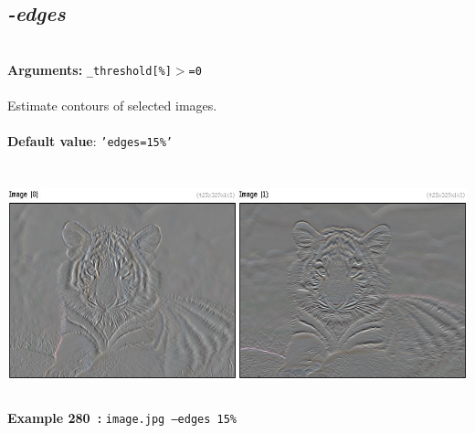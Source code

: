 \documentclass[a4paper,11pt,twoside]{book}
\begin{document}
\subsection{\emph{-edges} }\vspace*{-0.5em}
~\\\textbf{Arguments: } 
{\small \texttt{\_threshold[\%]$>$=0}}\\~\\
Estimate contours of selected images.
~\\~\\\textbf{Default value}: {\small \texttt{'edges=15\%'}}
\begin{center}\includegraphics[keepaspectratio=true,height=7cm,width=\textwidth]{img/gmic_def280.jpg}\\
{\footnotesize \textbf{Example 280~:} \texttt{image.jpg --edges 15\%}}
\end{center}
\end{document}
